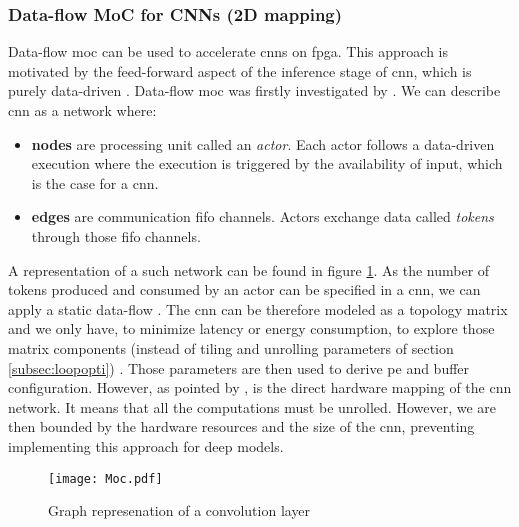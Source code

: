 \subsubsection{Data-flow MoC for CNNs (2D mapping)}
%
%
Data-flow \acrfull{moc} can be used to accelerate \acrshort{cnn}s on \acrshort{fpga}. This approach is motivated by the feed-forward aspect of the inference stage of \acrshort{cnn}, which is purely data-driven \cite{abdelouahab_accelerating_2018}. Data-flow \acrfull{moc} was firstly investigated by \cite{lin_li_low_2016}.  We can describe \acrshort{cnn} as a network where:
\begin{itemize}
    \item \textbf{nodes} are processing unit called an \textit{actor}. Each actor follows a data-driven execution where the execution is triggered by the availability of input, which is the case for a \acrshort{cnn}.
    \item \textbf{edges} are communication \acrshort{fifo} channels. Actors exchange data called \textit{tokens} through those \acrshort{fifo} channels.
\end{itemize}
A representation of a such network can be found in figure \ref{fig:moc}. \newline \newline
As the number of tokens produced and consumed by an actor can be specified in a \acrshort{cnn}, we can apply a static data-flow \cite{lee_static_1987}. The \acrshort{cnn} can be therefore modeled as a topology matrix and we only have, to minimize latency or energy consumption, to explore those matrix components (instead of tiling and unrolling parameters of section \ref{subsec:loopopti}) \cite{venieris_latency-driven_2017}. Those parameters are then used to derive \acrshort{pe} and buffer configuration. However, as pointed by \textcite{abdelouahab_tactics_2017}, is the direct hardware mapping of the \acrshort{cnn} network. It means that all the computations must be unrolled. However, we are then bounded by the hardware resources and the size of the \acrshort{cnn}, preventing implementing this approach for deep models.
\begin{figure}
    \centering
    \texttt{[image: Moc.pdf]}
    \caption{Graph represenation of a convolution layer}
    \label{fig:moc}
\end{figure}
%
%
